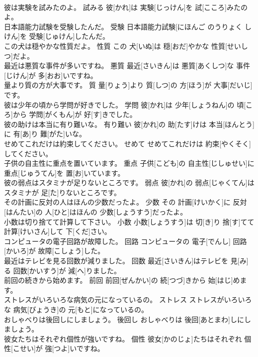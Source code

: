 \documentclass[8pt]{extreport}
\begin{document}
\begin{CJK}{UTF8}{min}
\\	彼は実験を試みたのよ。	試みる	彼[かれ]は 実験[じっけん]を 試[こころ]みたのよ。	
\\	日本語能力試験を受験したんだ。	受験	日本語能力試験[にほんご のうりょく しけん]を 受験[じゅけん]したんだ。	
\\	この犬は穏やかな性質だよ。	性質	この 犬[いぬ]は 穏[おだ]やかな 性質[せいしつ]だよ。	
\\	最近は悪質な事件が多いですね。	悪質	最近[さいきん]は 悪質[あくしつ]な 事件[じけん]が 多[おお]いですね。	
\\	量より質の方が大事です。	質	量[りょう]より 質[しつ]の 方[ほう]が 大事[だいじ]です。	
\\	彼は少年の頃から学問が好きでした。	学問	彼[かれ]は 少年[しょうねん]の 頃[ころ]から 学問[がくもん]が 好[す]きでした。	
\\	彼の助けは本当に有り難いな。	有り難い	彼[かれ]の 助[たす]けは 本当[ほんとう]に 有[あ]り 難[がた]いな。	
\\	せめてこれだけは約束してください。	せめて	せめてこれだけは 約束[やくそく]してください。	
\\	子供の自主性に重点を置いています。	重点	子供[こども]の 自主性[じしゅせい]に 重点[じゅうてん]を 置[お]いています。	
\\	彼の弱点はスタミナが足りないところです。	弱点	彼[かれ]の 弱点[じゃくてん]はスタミナが 足[た]りないところです。	
\\	その計画に反対の人はほんの少数だったよ。	少数	その 計画[けいかく]に 反対[はんたい]の 人[ひと]はほんの 少数[しょうすう]だったよ。	
\\	小数は切り捨てて計算して下さい。	小数	小数[しょうすう]は 切[き]り 捨[す]てて 計算[けいさん]して 下[くだ]さい。	
\\	コンピュータの電子回路が故障した。	回路	コンピュータの 電子[でんし] 回路[かいろ]が 故障[こしょう]した。	
\\	最近はテレビを見る回数が減りました。	回数	最近[さいきん]はテレビを 見[み]る 回数[かいすう]が 減[へ]りました。	
\\	前回の続きから始めます。	前回	前回[ぜんかい]の 続[つづ]きから 始[はじ]めます。	
\\	ストレスがいろいろな病気の元になっているの。	ストレス	ストレスがいろいろな 病気[びょうき]の 元[もと]になっているの。	
\\	おしゃべりは後回しにしましょう。	後回し	おしゃべりは 後回[あとまわ]しにしましょう。	
\\	彼女たちはそれぞれ個性が強いですね。	個性	彼女[かのじょ]たちはそれぞれ 個性[こせい]が 強[つよ]いですね。	

\end{CJK}
\end{document}
